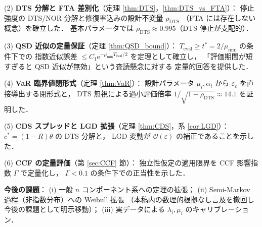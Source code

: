 \documentclass[12pt,a4paper]{article}
\theoremstyle{plain}
\theoremstyle{definition}
\theoremstyle{remark}
\newcommand{\calO}{\mathcal{O}}
\newcommand{\eps}{\varepsilon}
\newcommand{\e}{\mathrm{e}}
\newcommand{\rhoDTS}{\rho_{\mathrm{DTS}}}
\newcommand{\Teval}{T_{\mathrm{eval}}}
\begin{document}
(2) \textbf{DTS 分解と FTA 差別化}（定理 \ref{thm:DTS}，\ref{thm:DTS_vs_FTA}）：
停止強度の DTS/NOR 分解と修復率込みの設計不変量 $\rhoDTS$
（FTA には存在しない概念）を確立した．
基本パラメータでは $\rhoDTS\approx0.995$（DTS 停止が支配的）．

(3) \textbf{QSD 近似の定量保証}（定理 \ref{thm:QSD_bound}）：
$\Teval\ge t^*=2/\mu_{\min}$ の条件下での
指数近似誤差 $\le C_1\e^{-\mu_{\min}\Teval/2}$ を定理として確立し，
「評価期間が短すぎると QSD 近似が無効」という査読懸念に対する
定量的回答を提供した．

(4) \textbf{VaR 臨界値閉形式}（定理 \ref{thm:VaR}）：
設計パラメータ $\mu_i,\alpha_i$ から $\eps_c$ を直接導出する閉形式と，
DTS 無視による過小評価倍率 $1/\sqrt{1-\rhoDTS}\approx14.1$ を証明した．

(5) \textbf{CDS スプレッドと LGD 拡張}（定理 \ref{thm:CDS}，系 \ref{cor:LGD}）：
$c^*=(1-R)\theta$ の DTS 分解と，
LGD 変動が $\calO(\eps)$ の補正であることを示した．

(6) \textbf{CCF の定量評価}（第 \ref{sec:CCF} 節）：
独立性仮定の適用限界を CCF 影響指数 $\Gamma$ で定量化し，
$\Gamma<0.1$ の条件下での正当性を示した．

\textbf{今後の課題}：
(i) 一般 $n$ コンポーネント系への定理の拡張；
(ii) Semi-Markov 過程（非指数分布）への Weibull 拡張
（本稿内の数理的根拠なし言及を撤回し今後の課題として明示移動）；
(iii) 実データによる $\lambda_i,\mu_i$ のキャリブレーション．
\end{document}
